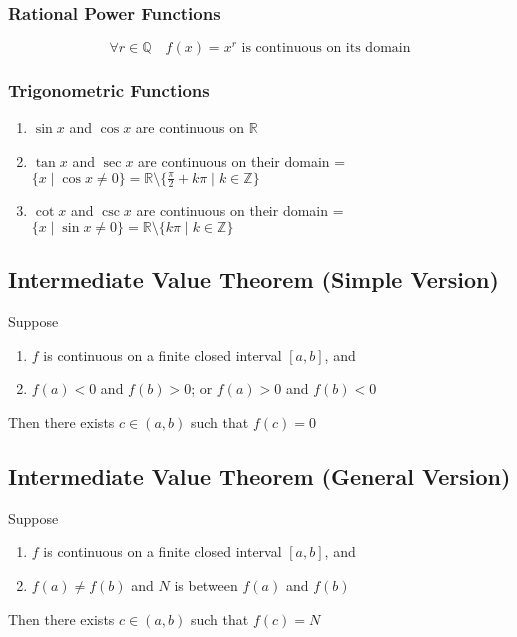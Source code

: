 \documentclass[../ma2002_notes.tex]{subfiles}
\begin{document}
\subsubsection{Rational Power Functions}
\[\forall r\in\mathbb{Q}\quad f(x)=x^r\text{ is continuous on its domain}\]

\subsubsection{Trigonometric Functions}
\begin{enumerate}
	\item \(\sin x\) and \(\cos x\) are continuous on \(\mathbb{R}\)
	\item \(\tan x\) and \(\sec x\) are continuous on their domain = \(\{x\mid \cos x\ne0\}=\mathbb{R}\setminus\{\frac{\pi}{2}+k\pi\mid k\in\mathbb{Z}\}\)
	\item \(\cot x\) and \(\csc x\) are continuous on their domain = \(\{x\mid \sin x\ne0\}=\mathbb{R}\setminus\{k\pi\mid k\in\mathbb{Z}\}\)
\end{enumerate}

\subsection{Intermediate Value Theorem (Simple Version)}
Suppose
\begin{enumerate}
	\item \(f\) is continuous on a finite closed interval \([a,b]\), and
	\item \(f(a)<0\) and \(f(b)>0\); or \(f(a)>0\) and \(f(b)<0\)
\end{enumerate}
Then there exists \(c\in(a,b)\) such that \(f(c)=0\)

\subsection{Intermediate Value Theorem (General Version)}
Suppose
\begin{enumerate}
	\item \(f\) is continuous on a finite closed interval \([a,b]\), and
	\item \(f(a)\ne f(b)\) and \(N\) is between \(f(a)\) and \(f(b)\)
\end{enumerate}
Then there exists \(c\in(a,b)\) such that \(f(c)=N\)
\end{document}
